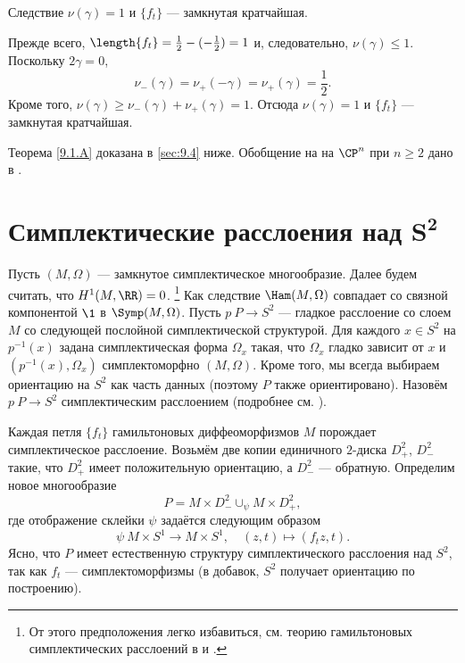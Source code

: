 \begin{thm}[(\cite{LM2})]{Следствие} $\nu(\gamma) = 1$ и $\{f_t\}$ --- замкнутая кратчайшая.
\end{thm}

Прежде всего, $\length\{f_t\} =\frac12 - (-\frac12 ) = 1$ и, следовательно, $\nu(\gamma) \le 1$.
Поскольку $2\gamma = 0$, 
\[\nu_- (\gamma) = \nu_+ (-\gamma) = \nu_+ (\gamma) =\frac12.\]
Кроме того, $\nu(\gamma) \ge \nu_- (\gamma) + \nu_+ (\gamma) = 1$.
Отсюда $\nu(\gamma) = 1$ и $\{f_t\}$ --- замкнутая кратчайшая.

Теорема \ref{9.1.A} доказана в \ref{sec:9.4} ниже.
Обобщение на на $\CP^n$ при $n \ge 2$ дано в \cite{P3}.


\section[\texorpdfstring{Симплектические расслоения над $S^2$}{Симплектические расслоения над S²}]{Симплектические расслоения над $\bm{S^2}$}
\label{sec:9.2}

Пусть $(M, \Omega)$ --- замкнутое симплектическое многообразие.
Далее будем считать, что $H^1 (M, \RR) = 0$.%
\footnote{От этого предположения легко избавиться, см. теорию гамильтоновых симплектических расслоений в \cite{MS} и \cite{P4}.}
Как следствие $\Ham(M, \Omega)$ совпадает со связной компонентой $\1$ в $\Symp(M, \Omega)$.
Пусть $p \: P \to S^2$ --- гладкое расслоение со слоем $M$ со следующей послойной симплектической структурой.
Для каждого $x \in S^2$ на $p^{-1} (x)$ задана симплектическая форма $\Omega_x$ такая, что $\Omega_x$ гладко зависит от $x$ и $(p^{-1} (x), \Omega_x)$  симплектоморфно $(M, \Omega)$.
Кроме того, мы всегда выбираем ориентацию на $S^2$ как часть данных (поэтому $P$ также ориентировано).
Назовём $p\: P\to S^2$ симплектическим расслоением (подробнее см. \cite{MS}).

Каждая петля $\{f_t\}$ гамильтоновых диффеоморфизмов $M$ порождает симплектическое расслоение.
Возьмём две копии единичного $2$-диска $D_+^2$, $D_-^2$ такие, что $D_+^2$ имеет положительную ориентацию, а $D_-^2$ --- обратную.
Определим новое многообразие
\[P =  M  \times D_-^2 \cup_\psi M \times D_+^2,\]
где отображение склейки $\psi$ задаётся следующим образом
\[\psi \: M \times S^1 \to M \times S^1,\quad (z, t) \mapsto (f_t z, t).\]
Ясно, что $P$ имеет естественную структуру симплектического расслоения над $S^2$, так как $f_t$ --- симплектоморфизмы (в добавок, $S^2$ получает ориентацию по построению).

